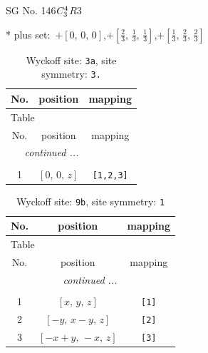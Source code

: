 \documentclass[fleqn,8pt]{jsarticle}
\begin{document}
\setcounter{MaxMatrixCols}{32}

\renewcommand{\tablename}{Table~}
\renewcommand{\figurename}{Figure~}
\begin{center}
\LARGE
SG No. 146\quad$C_{\rm 3}^{4}$\quad$R3$\quad[ trigonal ]
\end{center}
* plus set:\,\,\,$+\left[ 0,\, 0,\, 0 \right]$,\quad $+\left[ \frac{2}{3},\, \frac{1}{3},\, \frac{1}{3} \right]$,\quad $+\left[ \frac{1}{3},\, \frac{2}{3},\, \frac{2}{3} \right]$
\renewcommand{\arraystretch}{1.2}
\begin{longtable}{ccc}
\caption{Wyckoff site: {\tt 3a}, site symmetry: {\tt 3.}}
 \\
 \hline \hline
No. & position & mapping \\ \hline \endfirsthead

\multicolumn{2}{l}{\tablename\ \thetable{}} \\
 \hline \hline
No. & position & mapping \\ \hline \endhead

 \hline \hline
\multicolumn{2}{r}{\footnotesize\it continued ...} \\ \endfoot

 \hline \hline
\multicolumn{2}{r}{} \\ \endlastfoot

1 & $\left[ 0,\, 0,\, z \right]$ & {\tt [1,2,3]} \\
\end{longtable}
\renewcommand{\arraystretch}{1.2}
\begin{longtable}{ccc}
\caption{Wyckoff site: {\tt 9b}, site symmetry: {\tt 1}}
 \\
 \hline \hline
No. & position & mapping \\ \hline \endfirsthead

\multicolumn{2}{l}{\tablename\ \thetable{}} \\
 \hline \hline
No. & position & mapping \\ \hline \endhead

 \hline \hline
\multicolumn{2}{r}{\footnotesize\it continued ...} \\ \endfoot

 \hline \hline
\multicolumn{2}{r}{} \\ \endlastfoot

1 & $\left[ x,\, y,\, z \right]$ & {\tt [1]} \\ \hline
2 & $\left[ - y,\, x - y,\, z \right]$ & {\tt [2]} \\ \hline
3 & $\left[ - x + y,\, - x,\, z \right]$ & {\tt [3]} \\
\end{longtable}
\end{document}
